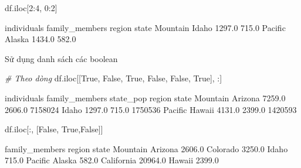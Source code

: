 \documentclass[
]{book}
\newenvironment{Shaded}{\begin{snugshade}}{\end{snugshade}}
\newcommand{\CommentTok}[1]{\textcolor[rgb]{0.56,0.35,0.01}{\textit{#1}}}
\newcommand{\DecValTok}[1]{\textcolor[rgb]{0.00,0.00,0.81}{#1}}
\newcommand{\NormalTok}[1]{#1}
\newcommand{\VariableTok}[1]{\textcolor[rgb]{0.00,0.00,0.00}{#1}}
\begin{document}
\begin{Shaded}
\begin{Highlighting}[]
\NormalTok{df.iloc[}\DecValTok{2}\NormalTok{:}\DecValTok{4}\NormalTok{, }\DecValTok{0}\NormalTok{:}\DecValTok{2}\NormalTok{]}
\end{Highlighting}
\end{Shaded}

\begin{Shaded}
\begin{Highlighting}[]
\NormalTok{                 individuals  family\_members}
\NormalTok{region   state                              }
\NormalTok{Mountain Idaho        1297.0           715.0}
\NormalTok{Pacific  Alaska       1434.0           582.0}
\end{Highlighting}
\end{Shaded}

Sử dụng danh sách các boolean

\begin{Shaded}
\begin{Highlighting}[]
\CommentTok{\# Theo dòng}
\NormalTok{df.iloc[[}\VariableTok{True}\NormalTok{, }\VariableTok{False}\NormalTok{, }\VariableTok{True}\NormalTok{, }\VariableTok{False}\NormalTok{, }\VariableTok{False}\NormalTok{, }\VariableTok{True}\NormalTok{], :]}
\end{Highlighting}
\end{Shaded}

\begin{Shaded}
\begin{Highlighting}[]
\NormalTok{                  individuals  family\_members  state\_pop}
\NormalTok{region   state                                          }
\NormalTok{Mountain Arizona       7259.0          2606.0    7158024}
\NormalTok{         Idaho         1297.0           715.0    1750536}
\NormalTok{Pacific  Hawaii        4131.0          2399.0    1420593}
\end{Highlighting}
\end{Shaded}

\begin{Shaded}
\begin{Highlighting}[]
\NormalTok{df.iloc[:, [}\VariableTok{False}\NormalTok{, }\VariableTok{True}\NormalTok{,}\VariableTok{False}\NormalTok{]]}
\end{Highlighting}
\end{Shaded}

\begin{Shaded}
\begin{Highlighting}[]
\NormalTok{                     family\_members}
\NormalTok{region   state                     }
\NormalTok{Mountain Arizona             2606.0}
\NormalTok{         Colorado            3250.0}
\NormalTok{         Idaho                715.0}
\NormalTok{Pacific  Alaska               582.0}
\NormalTok{         California         20964.0}
\NormalTok{         Hawaii              2399.0}
\end{Highlighting}
\end{Shaded}
\end{document}
